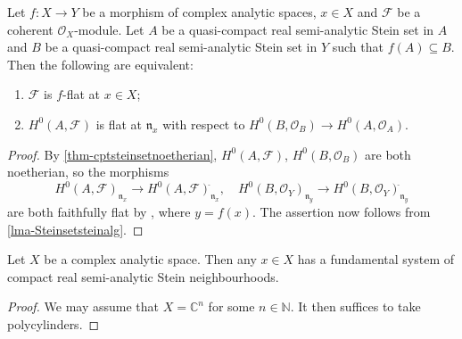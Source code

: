\begin{corollary}\label{cor-flatiffalgflat}
    Let $f:X\rightarrow Y$ be a morphism of complex analytic spaces, $x\in X$ and $\mathcal{F}$ be a coherent $\mathcal{O}_X$-module. Let $A$ be a quasi-compact real semi-analytic Stein set in $A$ and $B$ be a quasi-compact  real semi-analytic Stein set in $Y$ such that $f(A)\subseteq B$. Then the following are equivalent:
    \begin{enumerate}
        \item $\mathcal{F}$ is $f$-flat at $x\in X$;
        \item $H^0(A,\mathcal{F})$ is flat at $\mathfrak{n}_x$ with respect to $H^0(B,\mathcal{O}_B)\rightarrow H^0(A,\mathcal{O}_A)$.
    \end{enumerate}
\end{corollary}
\begin{proof}
    By \cref{thm-cptsteinsetnoetherian}, $H^0(A,\mathcal{F})$, $H^0(B,\mathcal{O}_B)$ are both noetherian, so the morphisms 
    \[
        H^0(A,\mathcal{F})_{\mathfrak{n}_x}\rightarrow H^0(A,\mathcal{F})_{\mathfrak{n}_x}^{\hat{}},\quad  H^0(B,\mathcal{O}_Y)_{\mathfrak{n}_y}\rightarrow H^0(B,\mathcal{O}_Y)_{\mathfrak{n}_y}^{\hat{}}
    \]
    are both faithfully flat by \cite[\href{https://stacks.math.columbia.edu/tag/00MC}{Tag 00MC}]{stacks-project}, where $y=f(x)$.
    The assertion now follows from \cref{lma-Steinsetsteinalg}.
\end{proof}



\begin{lemma}\label{lma-existencesteinsemananeigh}
    Let $X$ be a complex analytic space. Then any $x\in X$ has a fundamental system of compact real semi-analytic Stein neighbourhoods.
\end{lemma}
\begin{proof}
    We may assume that $X=\mathbb{C}^n$ for some $n\in \mathbb{N}$. It then suffices to take polycylinders.
\end{proof}

